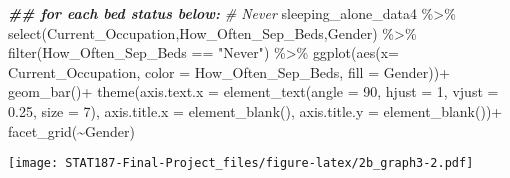 \documentclass[
]{article}
\newenvironment{Shaded}{\begin{snugshade}}{\end{snugshade}}
\newcommand{\AttributeTok}[1]{\textcolor[rgb]{0.77,0.63,0.00}{#1}}
\newcommand{\CommentTok}[1]{\textcolor[rgb]{0.56,0.35,0.01}{\textit{#1}}}
\newcommand{\DecValTok}[1]{\textcolor[rgb]{0.00,0.00,0.81}{#1}}
\newcommand{\DocumentationTok}[1]{\textcolor[rgb]{0.56,0.35,0.01}{\textbf{\textit{#1}}}}
\newcommand{\FloatTok}[1]{\textcolor[rgb]{0.00,0.00,0.81}{#1}}
\newcommand{\FunctionTok}[1]{\textcolor[rgb]{0.00,0.00,0.00}{#1}}
\newcommand{\NormalTok}[1]{#1}
\newcommand{\SpecialCharTok}[1]{\textcolor[rgb]{0.00,0.00,0.00}{#1}}
\newcommand{\StringTok}[1]{\textcolor[rgb]{0.31,0.60,0.02}{#1}}
\begin{document}
\begin{Shaded}
\begin{Highlighting}[]
\DocumentationTok{\#\# for each bed status below:}
\CommentTok{\# Never}
\NormalTok{sleeping\_alone\_data4 }\SpecialCharTok{\%\textgreater{}\%}
  \FunctionTok{select}\NormalTok{(Current\_Occupation,How\_Often\_Sep\_Beds,Gender) }\SpecialCharTok{\%\textgreater{}\%}
  \FunctionTok{filter}\NormalTok{(How\_Often\_Sep\_Beds }\SpecialCharTok{==} \StringTok{"Never"}\NormalTok{) }\SpecialCharTok{\%\textgreater{}\%}
  \FunctionTok{ggplot}\NormalTok{(}\FunctionTok{aes}\NormalTok{(}\AttributeTok{x=}\NormalTok{ Current\_Occupation,}
             \AttributeTok{color =}\NormalTok{ How\_Often\_Sep\_Beds,}
             \AttributeTok{fill =}\NormalTok{ Gender))}\SpecialCharTok{+}
  \FunctionTok{geom\_bar}\NormalTok{()}\SpecialCharTok{+}
  \FunctionTok{theme}\NormalTok{(}\AttributeTok{axis.text.x =} \FunctionTok{element\_text}\NormalTok{(}\AttributeTok{angle =} \DecValTok{90}\NormalTok{,}
                                   \AttributeTok{hjust =} \DecValTok{1}\NormalTok{,}
                                   \AttributeTok{vjust =} \FloatTok{0.25}\NormalTok{,}
                                   \AttributeTok{size =} \DecValTok{7}\NormalTok{),}
        \AttributeTok{axis.title.x =} \FunctionTok{element\_blank}\NormalTok{(),}
        \AttributeTok{axis.title.y =} \FunctionTok{element\_blank}\NormalTok{())}\SpecialCharTok{+}
  \FunctionTok{facet\_grid}\NormalTok{(}\SpecialCharTok{\textasciitilde{}}\NormalTok{Gender)}
\end{Highlighting}
\end{Shaded}

\texttt{[image: STAT187-Final-Project\_files/figure-latex/2b\_graph3-2.pdf]}
\end{document}

